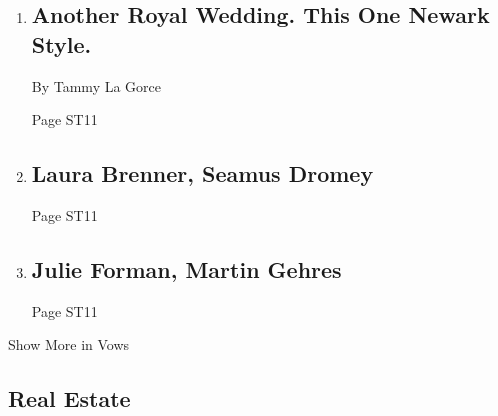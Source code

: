 \begin{enumerate}
\def\labelenumi{\arabic{enumi}.}
\item
  \href{/2018/06/15/fashion/weddings/another-royal-wedding-this-one-newark-style.html}{}

  \hypertarget{another-royal-wedding-this-one-newark-style}{%
  \subsection{Another Royal Wedding. This One Newark
  Style.}\label{another-royal-wedding-this-one-newark-style}}

  By Tammy La Gorce

  Page ST11
\item
  \href{/2018/06/17/fashion/weddings/laura-brenner-seamus-dromey.html}{}

  \hypertarget{laura-brenner-seamus-dromey}{%
  \subsection{Laura Brenner, Seamus
  Dromey}\label{laura-brenner-seamus-dromey}}

  Page ST11
\item
  \href{/2018/06/17/fashion/weddings/julie-forman-martin-gehres.html}{}

  \hypertarget{julie-forman-martin-gehres}{%
  \subsection{Julie Forman, Martin
  Gehres}\label{julie-forman-martin-gehres}}

  Page ST11
\end{enumerate}

Show More in Vows

\hypertarget{real-estate}{%
\subsection{Real Estate}\label{real-estate}}

